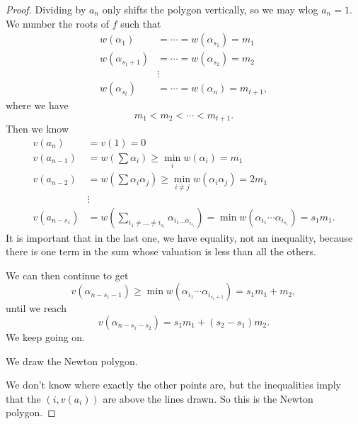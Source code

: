 \documentclass[a4paper]{article}
\begin{document}
\begin{proof}
  Dividing by $a_n$ only shifts the polygon vertically, so we may wlog $a_n = 1$. We number the roots of $f$ such that
  \begin{align*}
    w(\alpha_1) &= \cdots = w(\alpha_{s_1}) = m_1\\
    w(\alpha_{s_1 + 1}) &= \cdots = w(\alpha_{s_2}) = m_2\\
    &\vdots\\
    w(\alpha_{s_t}) &= \cdots = w(\alpha_n) = m_{t + 1},
  \end{align*}
  where we have
  \[
    m_1 < m_2 < \cdots < m_{t + 1}.
  \]
  Then we know
  \begin{align*}
    v(a_n) &= v(1) = 0\\
    v(a_{n - 1}) &= w\left(\sum \alpha_i\right) \geq \min_i w(\alpha_i) = m_1\\
    v(a_{n - 2}) &= w\left(\sum \alpha_i\alpha_j\right) \geq \min_{i \not= j} w(\alpha_i \alpha_j) = 2 m_1\\
    &\vdots\\
    v(a_{n - s_1}) &= w\left(\sum_{i_1\not=\ldots \not=i_{s_1}} \alpha_{i_1 \ldots \alpha_{i_{s_1}}}\right) = \min w(\alpha_{i_1}\cdots\alpha_{i_{s_1}}) = s_1 m_1.
  \end{align*}
  It is important that in the last one, we have equality, not an inequality, because there is one term in the sum whose valuation is less than all the others.

  We can then continue to get
  \[
    v(\alpha_{n - s_1 - 1}) \geq \min w(\alpha_{i_1} \cdots \alpha_{i_{s_1 + 1}}) = s_1 m_1 + m_2,
  \]
  until we reach
  \[
    v(\alpha_{n - s_1 - s_2}) = s_1 m_1 + (s_2 - s_1) m_2.
  \]
  We keep going on.

  We draw the Newton polygon.
  \begin{center}
  \end{center}
  We don't know where exactly the other points are, but the inequalities imply that the $(i, v(a_i))$ are above the lines drawn. So this is the Newton polygon.


\end{proof}
\end{document}
